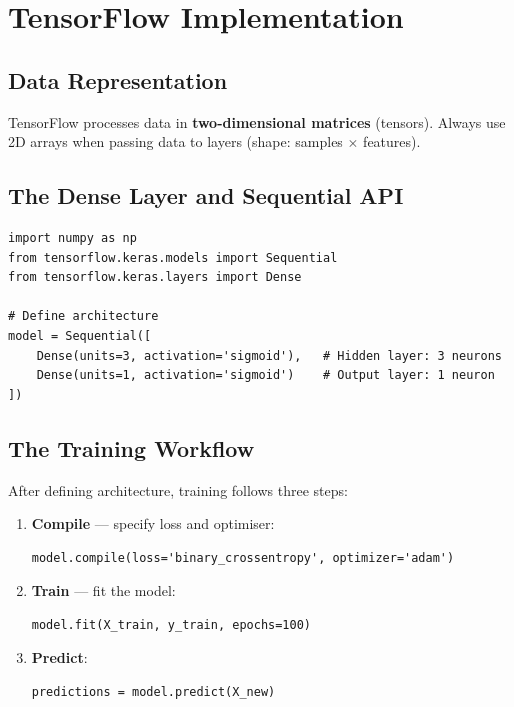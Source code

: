 \section{TensorFlow Implementation}

\subsection{Data Representation}

TensorFlow processes data in \textbf{two-dimensional matrices} (tensors). Always
use 2D arrays when passing data to layers (shape: samples $\times$ features).

\subsection{The Dense Layer and Sequential API}

\begin{lstlisting}[caption={Sequential model for coffee roasting classification}]
import numpy as np
from tensorflow.keras.models import Sequential
from tensorflow.keras.layers import Dense

# Define architecture
model = Sequential([
    Dense(units=3, activation='sigmoid'),   # Hidden layer: 3 neurons
    Dense(units=1, activation='sigmoid')    # Output layer: 1 neuron
])
\end{lstlisting}

\subsection{The Training Workflow}

After defining architecture, training follows three steps:
\begin{enumerate}
\item \textbf{Compile} — specify loss and optimiser:
\begin{lstlisting}
model.compile(loss='binary_crossentropy', optimizer='adam')
\end{lstlisting}
\item \textbf{Train} — fit the model:
\begin{lstlisting}
model.fit(X_train, y_train, epochs=100)
\end{lstlisting}
\item \textbf{Predict}:
\begin{lstlisting}
predictions = model.predict(X_new)
\end{lstlisting}
\end{enumerate}

